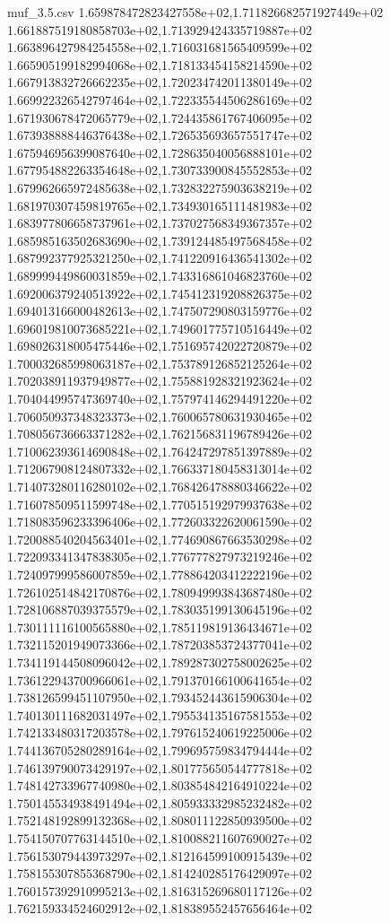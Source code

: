 \begin{filecontents*}{muf_3.5.csv}
1.659878472823427558e+02,1.711826682571927449e+02
1.661887519180858703e+02,1.713929424335719887e+02
1.663896427984254558e+02,1.716031681565409599e+02
1.665905199182994068e+02,1.718133454158214590e+02
1.667913832726662235e+02,1.720234742011380149e+02
1.669922326542797464e+02,1.722335544506286169e+02
1.671930678472065779e+02,1.724435861767406095e+02
1.673938888446376438e+02,1.726535693657551747e+02
1.675946956399087640e+02,1.728635040056888101e+02
1.677954882263354648e+02,1.730733900845552853e+02
1.679962665972485638e+02,1.732832275903638219e+02
1.681970307459819765e+02,1.734930165111481983e+02
1.683977806658737961e+02,1.737027568349367357e+02
1.685985163502683690e+02,1.739124485497568458e+02
1.687992377925321250e+02,1.741220916436541302e+02
1.689999449860031859e+02,1.743316861046823760e+02
1.692006379240513922e+02,1.745412319208826375e+02
1.694013166000482613e+02,1.747507290803159776e+02
1.696019810073685221e+02,1.749601775710516449e+02
1.698026318005475446e+02,1.751695742022720879e+02
1.700032685998063187e+02,1.753789126852125264e+02
1.702038911937949877e+02,1.755881928321923624e+02
1.704044995747369740e+02,1.757974146294491220e+02
1.706050937348323373e+02,1.760065780631930465e+02
1.708056736663371282e+02,1.762156831196789426e+02
1.710062393614690848e+02,1.764247297851397889e+02
1.712067908124807332e+02,1.766337180458313014e+02
1.714073280116280102e+02,1.768426478880346622e+02
1.716078509511599748e+02,1.770515192979937638e+02
1.718083596233396406e+02,1.772603322620061590e+02
1.720088540204563401e+02,1.774690867663530298e+02
1.722093341347838305e+02,1.776777827973219246e+02
1.724097999586007859e+02,1.778864203412222196e+02
1.726102514842170876e+02,1.780949993843687480e+02
1.728106887039375579e+02,1.783035199130645196e+02
1.730111116100565880e+02,1.785119819136434671e+02
1.732115201949073366e+02,1.787203853724377041e+02
1.734119144508096042e+02,1.789287302758002625e+02
1.736122943700966061e+02,1.791370166100641654e+02
1.738126599451107950e+02,1.793452443615906304e+02
1.740130111682031497e+02,1.795534135167581553e+02
1.742133480317203578e+02,1.797615240619225006e+02
1.744136705280289164e+02,1.799695759834794444e+02
1.746139790073429197e+02,1.801775650544777818e+02
1.748142733967740980e+02,1.803854842164910224e+02
1.750145534938491494e+02,1.805933332985232482e+02
1.752148192899132368e+02,1.808011122850939500e+02
1.754150707763144510e+02,1.810088211607690027e+02
1.756153079443973297e+02,1.812164599100915439e+02
1.758155307855368790e+02,1.814240285176429097e+02
1.760157392910995213e+02,1.816315269680117126e+02
1.762159334524602912e+02,1.818389552457656464e+02

\end{filecontents*}
